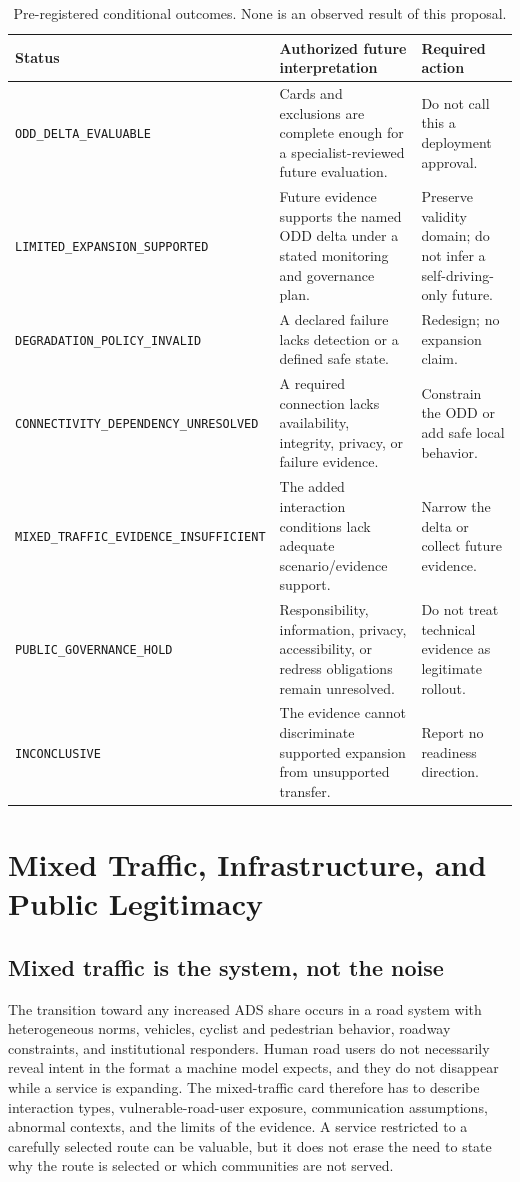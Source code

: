 \documentclass[conference]{../../../../Conference-LaTeX-template_10-17-19/IEEEtran}
\begin{document}
\begin{table}[!t]
\caption{Pre-registered conditional outcomes. None is an observed result of this proposal.}
\label{tab:outcomes}
\centering
\small
\begin{tabularx}{\textwidth}{lY Y}
\toprule
Status & Authorized future interpretation & Required action \\
\midrule
\texttt{ODD\_DELTA\_EVALUABLE} & Cards and exclusions are complete enough for a specialist-reviewed future evaluation. & Do not call this a deployment approval. \\
\texttt{LIMITED\_EXPANSION\_SUPPORTED} & Future evidence supports the named ODD delta under a stated monitoring and governance plan. & Preserve validity domain; do not infer a self-driving-only future. \\
\texttt{DEGRADATION\_POLICY\_INVALID} & A declared failure lacks detection or a defined safe state. & Redesign; no expansion claim. \\
\texttt{CONNECTIVITY\_DEPENDENCY\_UNRESOLVED} & A required connection lacks availability, integrity, privacy, or failure evidence. & Constrain the ODD or add safe local behavior. \\
\texttt{MIXED\_TRAFFIC\_EVIDENCE\_INSUFFICIENT} & The added interaction conditions lack adequate scenario/evidence support. & Narrow the delta or collect future evidence. \\
\texttt{PUBLIC\_GOVERNANCE\_HOLD} & Responsibility, information, privacy, accessibility, or redress obligations remain unresolved. & Do not treat technical evidence as legitimate rollout. \\
\texttt{INCONCLUSIVE} & The evidence cannot discriminate supported expansion from unsupported transfer. & Report no readiness direction. \\
\bottomrule
\end{tabularx}
\end{table}

\section{Mixed Traffic, Infrastructure, and Public Legitimacy}
\subsection{Mixed traffic is the system, not the noise}
The transition toward any increased ADS share occurs in a road system with heterogeneous norms, vehicles, cyclist and pedestrian behavior, roadway constraints, and institutional responders. Human road users do not necessarily reveal intent in the format a machine model expects, and they do not disappear while a service is expanding. The mixed-traffic card therefore has to describe interaction types, vulnerable-road-user exposure, communication assumptions, abnormal contexts, and the limits of the evidence. A service restricted to a carefully selected route can be valuable, but it does not erase the need to state why the route is selected or which communities are not served.
\end{document}
